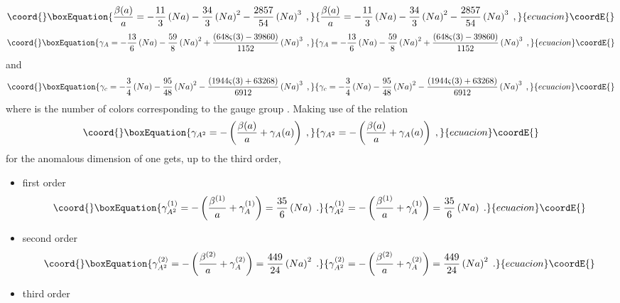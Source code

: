 \documentclass[a4paper,12pt]{article}
\begin{document}
\begin{equation}\coord{}\boxEquation{
\frac{\beta (a)}{a}=-\frac{11}{3}\left( Na\right) -\frac{34}{3}\left(
Na\right) ^{2}-\frac{2857}{54}\left( Na\right) ^{3}\;,  \label{beta}
}{
\frac{\beta (a)}{a}=-\frac{11}{3}\left( Na\right) -\frac{34}{3}\left(
Na\right) ^{2}-\frac{2857}{54}\left( Na\right) ^{3}\;,  }{ecuacion}\coordE{}\end{equation}
\begin{equation}\coord{}\boxEquation{
\gamma _{A}=-\frac{13}{6}\left( Na\right) -\frac{59}{8}\left( Na\right) ^{2}+
\frac{\left( 648\varsigma (3)-39860\right) }{1152}\left( Na\right) ^{3}\;,
\label{ga}
}{
\gamma _{A}=-\frac{13}{6}\left( Na\right) -\frac{59}{8}\left( Na\right) ^{2}+
\frac{\left( 648\varsigma (3)-39860\right) }{1152}\left( Na\right) ^{3}\;,
}{ecuacion}\coordE{}\end{equation}
and 
\begin{equation}\coord{}\boxEquation{
\gamma _{c}=-\frac{3}{4}\left( Na\right) -\frac{95}{48}\left( Na\right) ^{2}-
\frac{\left( 1944\varsigma (3)+63268\right) }{6912}\left( Na\right) ^{3}\;,
\label{gc}
}{
\gamma _{c}=-\frac{3}{4}\left( Na\right) -\frac{95}{48}\left( Na\right) ^{2}-
\frac{\left( 1944\varsigma (3)+63268\right) }{6912}\left( Na\right) ^{3}\;,
}{ecuacion}\coordE{}\end{equation}
where \coordHE{} is the number of colors corresponding to the gauge group \coordHE{}.
Making use of the relation 
\begin{equation}\coord{}\boxEquation{
\gamma _{A^{2}}=-\left( \frac{\beta (a)}{a}+\gamma _{A}(a)\right) \;,
\label{ga2}
}{
\gamma _{A^{2}}=-\left( \frac{\beta (a)}{a}+\gamma _{A}(a)\right) \;,
}{ecuacion}\coordE{}\end{equation}
for the anomalous dimension of \coordHE{}one gets, up to the
third order,

\begin{itemize}
\item  first order 
\begin{equation}\coord{}\boxEquation{
\gamma _{A^{2}}^{(1)}=-\left( \frac{\beta ^{(1)}}{a}+\gamma
_{A}^{(1)}\right) =\frac{35}{6}\left( Na\right) \;.  \label{aa1}
}{
\gamma _{A^{2}}^{(1)}=-\left( \frac{\beta ^{(1)}}{a}+\gamma
_{A}^{(1)}\right) =\frac{35}{6}\left( Na\right) \;.  }{ecuacion}\coordE{}\end{equation}

\item  second order 
\begin{equation}\coord{}\boxEquation{
\gamma _{A^{2}}^{(2)}=-\left( \frac{\beta ^{(2)}}{a}+\gamma
_{A}^{(2)}\right) =\frac{449}{24}\left( Na\right) ^{2}\;.  \label{aa2}
}{
\gamma _{A^{2}}^{(2)}=-\left( \frac{\beta ^{(2)}}{a}+\gamma
_{A}^{(2)}\right) =\frac{449}{24}\left( Na\right) ^{2}\;.  }{ecuacion}\coordE{}\end{equation}

\item  third order
\end{itemize}
\end{document}
